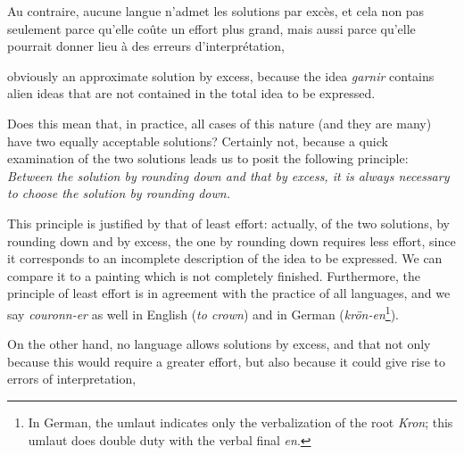 \begin{sloppypar}
{  Au contraire, aucune langue n’admet les solutions par excès, et cela
  non pas seulement parce qu’elle coûte un effort plus grand, mais
  aussi parce qu’elle pourrait donner lieu à des erreurs
  d’interprétation,

}
%
{\noindent
  obviously an approximate solution by excess, because the idea
  \emph{garnir} contains alien ideas that are not contained in the total
  idea to be expressed.

  Does this mean that, in practice, all cases of this nature (and they
  are many) have two equally acceptable solutions? Certainly not,
  because a quick examination of the two solutions leads us to posit
  the following principle: \emph{Between the solution by rounding down
    and that by excess, it is always necessary to choose the solution
    by rounding down.}

  This principle is justified by that of least effort: actually, of
  the two solutions, by rounding down and by excess, the one by rounding down
  requires less effort, since it corresponds to an incomplete
  description of the idea to be expressed.  We can compare it to a
  painting which is not completely finished. Furthermore, the
  principle of least effort is in agreement with the practice of all
  languages, and we say \emph{couronn-er} as well in English (\emph{to
    crown}) and in German (\emph{krön-en}\footnote{In German, the
    umlaut indicates only the verbalization of the root \emph{Kron};
    this umlaut does double duty with the verbal final \emph{en}.}).

  On the other hand, no language allows solutions by excess, and that
  not only because this would require a greater effort, but also
  because it could give rise to errors of interpretation,

}

\end{sloppypar}
